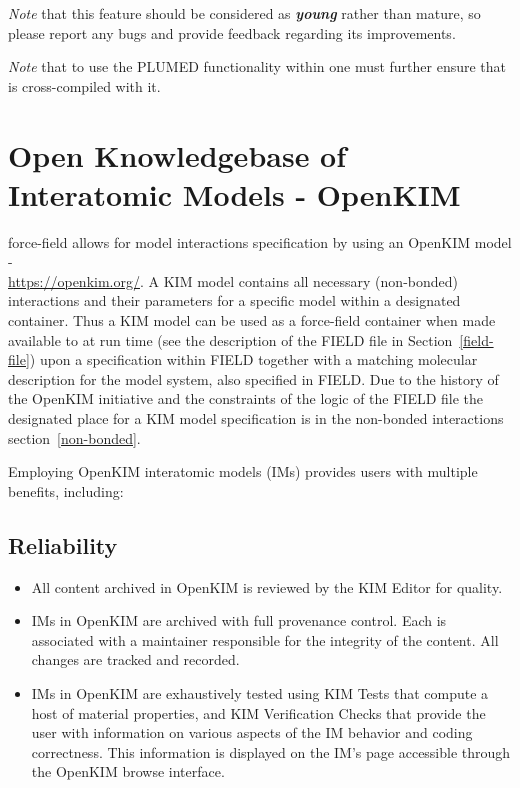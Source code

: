 \emph{Note} that this feature should be considered as \textbf{\textit{young}} rather
than mature, so please report any bugs and provide feedback regarding its
improvements.

\emph{Note} that to use the PLUMED functionality within \D one must
further ensure that \D is cross-compiled with it.

\section{Open Knowledgebase of Interatomic Models - OpenKIM}
\label{kim}

\D force-field allows for model interactions specification by using an
OpenKIM model - \\ \href{https://openkim.org/}{https://openkim.org/}.
A KIM model contains all necessary (non-bonded) interactions and their
parameters for a specific model within a designated container.  Thus a
KIM model can be used as a force-field container when
made available to \D at run time (see the description of the FIELD file in
Section~\ref{field-file}) upon a specification within FIELD together with a
matching molecular description for the model system, also specified in FIELD.
Due to the history of the OpenKIM initiative and the constraints of the logic
of the \D FIELD file the designated place for a KIM model specification is
in the non-bonded interactions section~\ref{non-bonded}.

Employing OpenKIM interatomic models (IMs) provides \D users with multiple
benefits, including:
\subsection*{Reliability}
\begin{itemize}
\item All content archived in OpenKIM is reviewed by the KIM Editor for quality.
\item IMs in OpenKIM are archived with full provenance control. Each is associated
with a maintainer responsible for the integrity of the content. All changes are
tracked and recorded.
\item IMs in OpenKIM are exhaustively tested using KIM Tests that compute a host
of material properties, and KIM Verification Checks that provide the user with
information on various aspects of the IM behavior and coding correctness.
This information is displayed on the IM’s page accessible through the OpenKIM
browse interface.
\end{itemize}

